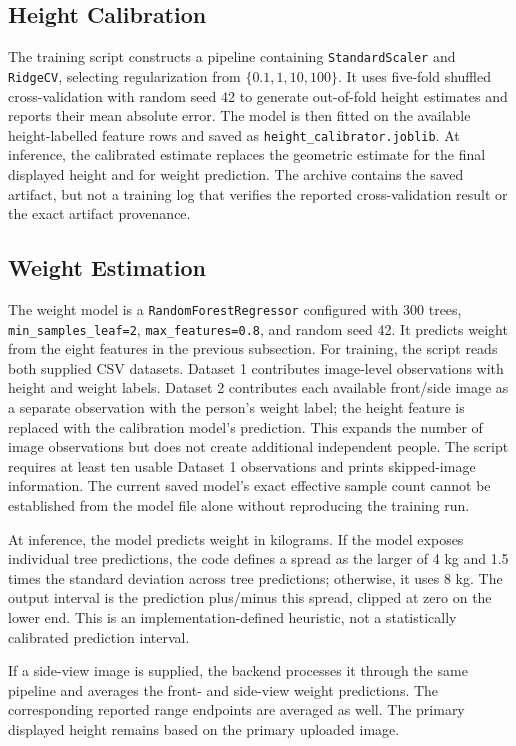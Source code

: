 \documentclass[conference]{IEEEtran}
\begin{document}
\subsection{Height Calibration}
The training script constructs a pipeline containing \texttt{StandardScaler} and \texttt{RidgeCV}, selecting regularization from $\{0.1,1,10,100\}$. It uses five-fold shuffled cross-validation with random seed 42 to generate out-of-fold height estimates and reports their mean absolute error. The model is then fitted on the available height-labelled feature rows and saved as \texttt{height\_calibrator.joblib}. At inference, the calibrated estimate replaces the geometric estimate for the final displayed height and for weight prediction. The archive contains the saved artifact, but not a training log that verifies the reported cross-validation result or the exact artifact provenance.

\subsection{Weight Estimation}
The weight model is a \texttt{RandomForestRegressor} configured with 300 trees, \texttt{min\_samples\_leaf=2}, \texttt{max\_features=0.8}, and random seed 42. It predicts weight from the eight features in the previous subsection. For training, the script reads both supplied CSV datasets. Dataset 1 contributes image-level observations with height and weight labels. Dataset 2 contributes each available front/side image as a separate observation with the person's weight label; the height feature is replaced with the calibration model's prediction. This expands the number of image observations but does not create additional independent people. The script requires at least ten usable Dataset 1 observations and prints skipped-image information. The current saved model's exact effective sample count cannot be established from the model file alone without reproducing the training run.

At inference, the model predicts weight in kilograms. If the model exposes individual tree predictions, the code defines a spread as the larger of 4 kg and 1.5 times the standard deviation across tree predictions; otherwise, it uses 8 kg. The output interval is the prediction plus/minus this spread, clipped at zero on the lower end. This is an implementation-defined heuristic, not a statistically calibrated prediction interval.

If a side-view image is supplied, the backend processes it through the same pipeline and averages the front- and side-view weight predictions. The corresponding reported range endpoints are averaged as well. The primary displayed height remains based on the primary uploaded image.
\end{document}
